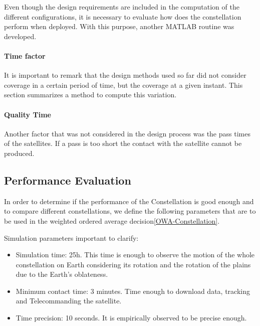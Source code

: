 \label{ch:PerformanceAnal}
Even though the design requirements are included in the computation of the different configurations, it is necessary to evaluate how does the constellation perform when deployed. With this purpose, another MATLAB routine was developed. 

\paragraph{Time factor}It is important to remark that the design methods used so far did not consider coverage in a certain period of time, but the coverage at a given instant. This section summarizes a method to compute this variation.

\paragraph{Quality Time}Another factor that was not considered in the design process was the pass times of the satellites. If a pass is too short the contact with the satellite cannot be produced. 

\subsection{Performance Evaluation}
In order to determine if the performance of the Constellation is good enough and to compare different constellations, we define the following parameters that are to be used in the weighted ordered average decision\ref{OWA-Constellation}.

Simulation parameters important to clarify:
\begin{itemize}
\item Simulation time: 25h. This time is enough to observe the motion of the whole constellation on Earth considering its rotation and the rotation of the plains due to the Earth's oblateness.
\item Minimum contact time: 3 minutes. Time enough to download data, tracking and Telecommanding the satellite.
\item Time precision: 10 seconds. It is empirically observed to be precise enough.
\end{itemize}

